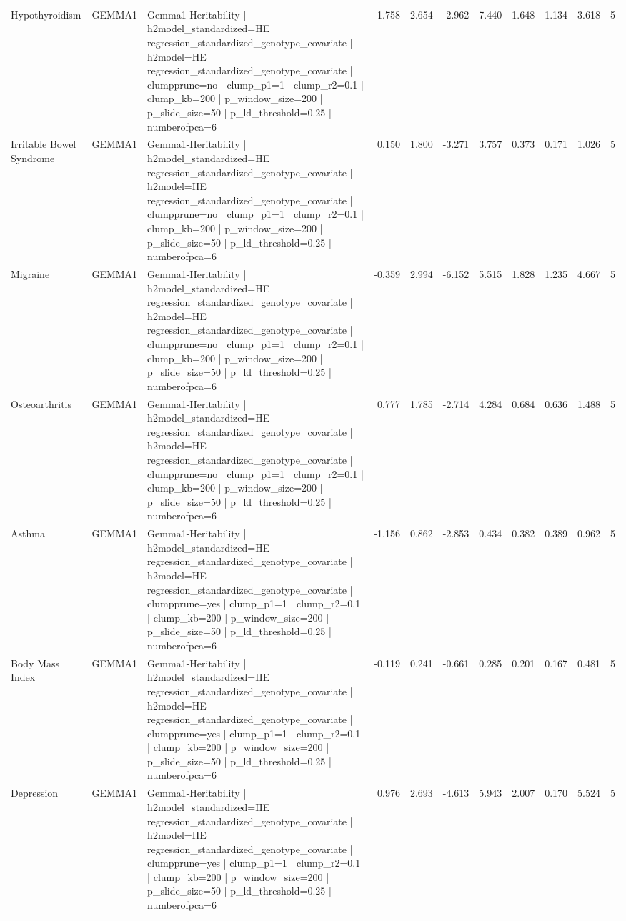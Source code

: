 \begin{landscape}
\begin{longtable}{p{2.4cm}p{1.8cm}p{6.0cm}rrrrrrrr}
Hypothyroidism & GEMMA1 & Gemma1-Heritability | h2model\_standardized=HE regression\_standardized\_genotype\_covariate | h2model=HE regression\_standardized\_genotype\_covariate | clumpprune=no | clump\_p1=1 | clump\_r2=0.1 | clump\_kb=200 | p\_window\_size=200 | p\_slide\_size=50 | p\_ld\_threshold=0.25 | numberofpca=6 & 1.758 & 2.654 & -2.962 & 7.440 & 1.648 & 1.134 & 3.618 & 5 \\
Irritable Bowel Syndrome & GEMMA1 & Gemma1-Heritability | h2model\_standardized=HE regression\_standardized\_genotype\_covariate | h2model=HE regression\_standardized\_genotype\_covariate | clumpprune=no | clump\_p1=1 | clump\_r2=0.1 | clump\_kb=200 | p\_window\_size=200 | p\_slide\_size=50 | p\_ld\_threshold=0.25 | numberofpca=6 & 0.150 & 1.800 & -3.271 & 3.757 & 0.373 & 0.171 & 1.026 & 5 \\
Migraine & GEMMA1 & Gemma1-Heritability | h2model\_standardized=HE regression\_standardized\_genotype\_covariate | h2model=HE regression\_standardized\_genotype\_covariate | clumpprune=no | clump\_p1=1 | clump\_r2=0.1 | clump\_kb=200 | p\_window\_size=200 | p\_slide\_size=50 | p\_ld\_threshold=0.25 | numberofpca=6 & -0.359 & 2.994 & -6.152 & 5.515 & 1.828 & 1.235 & 4.667 & 5 \\
Osteoarthritis & GEMMA1 & Gemma1-Heritability | h2model\_standardized=HE regression\_standardized\_genotype\_covariate | h2model=HE regression\_standardized\_genotype\_covariate | clumpprune=no | clump\_p1=1 | clump\_r2=0.1 | clump\_kb=200 | p\_window\_size=200 | p\_slide\_size=50 | p\_ld\_threshold=0.25 | numberofpca=6 & 0.777 & 1.785 & -2.714 & 4.284 & 0.684 & 0.636 & 1.488 & 5 \\
Asthma & GEMMA1 & Gemma1-Heritability | h2model\_standardized=HE regression\_standardized\_genotype\_covariate | h2model=HE regression\_standardized\_genotype\_covariate | clumpprune=yes | clump\_p1=1 | clump\_r2=0.1 | clump\_kb=200 | p\_window\_size=200 | p\_slide\_size=50 | p\_ld\_threshold=0.25 | numberofpca=6 & -1.156 & 0.862 & -2.853 & 0.434 & 0.382 & 0.389 & 0.962 & 5 \\
Body Mass Index & GEMMA1 & Gemma1-Heritability | h2model\_standardized=HE regression\_standardized\_genotype\_covariate | h2model=HE regression\_standardized\_genotype\_covariate | clumpprune=yes | clump\_p1=1 | clump\_r2=0.1 | clump\_kb=200 | p\_window\_size=200 | p\_slide\_size=50 | p\_ld\_threshold=0.25 | numberofpca=6 & -0.119 & 0.241 & -0.661 & 0.285 & 0.201 & 0.167 & 0.481 & 5 \\
Depression & GEMMA1 & Gemma1-Heritability | h2model\_standardized=HE regression\_standardized\_genotype\_covariate | h2model=HE regression\_standardized\_genotype\_covariate | clumpprune=yes | clump\_p1=1 | clump\_r2=0.1 | clump\_kb=200 | p\_window\_size=200 | p\_slide\_size=50 | p\_ld\_threshold=0.25 | numberofpca=6 & 0.976 & 2.693 & -4.613 & 5.943 & 2.007 & 0.170 & 5.524 & 5 \\

\end{longtable}
\end{landscape}
